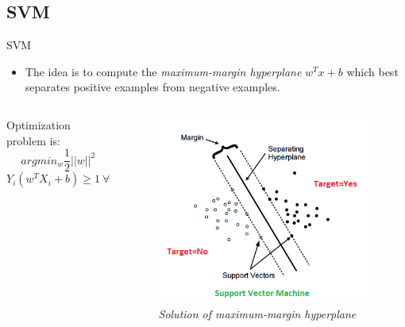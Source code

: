 \subsection{SVM}
\begin{frame}{SVM}
	\begin{itemize}\setlength\itemsep{1em}
		\item The idea is to compute the \textit{maximum-margin hyperplane} $w^Tx + b$ which best separates positive examples from negative examples.
	\end{itemize}
	\begin{columns}
		\begin{column}{0.5\textwidth}\centering
			Optimization problem is:
			$$arg min_w \frac{1}{2} ||w||^2$$
			$$Y_i (w^T X_i + b) \geq 1 \ \forall i \in [1, n]$$
		\end{column}
		\begin{column}{0.5\textwidth}\centering
			\begin{figure}[htbp]
				\centering
				\includegraphics[scale = 0.40]{./images/optimal-hyperplane2.png}
				\caption{\textit{Solution of maximum-margin hyperplane}}
			\end{figure}
		\end{column}
	\end{columns}
	
	
	
\end{frame}

